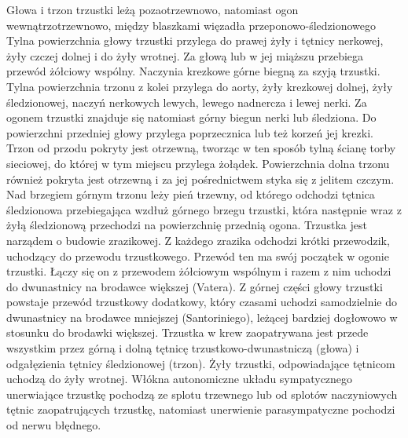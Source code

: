 \documentclass[a4paper, 12pt]{report}
\begin{document}
Głowa i trzon trzustki leżą pozaotrzewnowo, natomiast ogon
wewnątrzotrzewnowo, między blaszkami więzadła przeponowo-śledzionowego
Tylna powierzchnia głowy trzustki przylega do prawej żyły i tętnicy
nerkowej, żyły czczej dolnej i do żyły wrotnej. Za głową lub w jej
miąższu przebiega przewód żółciowy wspólny. Naczynia krezkowe górne
biegną za szyją trzustki. Tylna powierzchnia trzonu z kolei przylega
do aorty, żyły krezkowej dolnej, żyły śledzionowej, naczyń nerkowych
lewych, lewego nadnercza i lewej nerki. Za ogonem trzustki znajduje
się natomiast górny biegun nerki lub śledziona. Do powierzchni
przedniej głowy przylega poprzecznica lub też korzeń jej krezki. Trzon
od przodu pokryty jest otrzewną, tworząc w ten sposób tylną ścianę
torby sieciowej, do której w tym miejscu przylega
żołądek. Powierzchnia dolna trzonu również pokryta jest otrzewną i za
jej pośrednictwem styka się z jelitem czczym. Nad brzegiem górnym
trzonu leży pień trzewny, od którego odchodzi tętnica śledzionowa
przebiegająca wzdłuż górnego brzegu trzustki, która następnie wraz z
żyłą śledzionową przechodzi na powierzchnię przednią ogona.  Trzustka
jest narządem o budowie zrazikowej. Z każdego zrazika odchodzi krótki
przewodzik, uchodzący do przewodu trzustkowego. Przewód ten ma swój
początek w ogonie trzustki. Łączy się on z przewodem żółciowym
wspólnym i razem z nim uchodzi do dwunastnicy na brodawce większej
(Vatera). Z górnej części głowy trzustki powstaje przewód trzustkowy
dodatkowy, który czasami uchodzi samodzielnie do dwunastnicy na
brodawce mniejszej (Santoriniego), leżącej bardziej dogłowowo w
stosunku do brodawki większej.  Trzustka w krew zaopatrywana jest
przede wszystkim przez górną i dolną tętnicę trzustkowo-dwunastniczą
(głowa) i odgałęzienia tętnicy śledzionowej (trzon). Żyły trzustki,
odpowiadające tętnicom uchodzą do żyły wrotnej. Włókna autonomiczne
układu sympatycznego unerwiające trzustkę pochodzą ze splotu trzewnego
lub od splotów naczyniowych tętnic zaopatrujących trzustkę, natomiast
unerwienie parasympatyczne pochodzi od nerwu błędnego.
\end{document}
